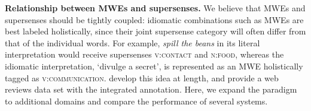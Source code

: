 \documentclass[11pt,letterpaper]{article}
\newcommand{\sst}[1]{\textsc{#1}} %
\newcommand{\lex}[1]{\textit{#1}} %
\newcommand{\longversion}[1]{#1} %
\begin{document}
% 
% 


\textbf{Relationship between MWEs and supersenses.}
We believe that MWEs and supersenses should be tightly coupled:
idiomatic combinations such as MWEs are best labeled holistically,
since their joint supersense category will often differ from that of the individual words.
For example, \lex{spill the beans} in its literal interpretation
would receive supersenses \sst{v:contact} and \sst{n:food},
whereas the idiomatic interpretation, `divulge a secret', is represented as
an MWE holistically tagged as \sst{v:communication}.
 develop this idea at length, and provide a web reviews data set
with the integrated annotation. Here, we expand the paradigm to additional domains
and compare the performance of several systems.
\end{document}
